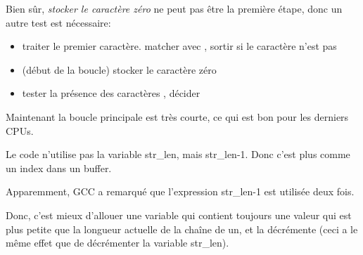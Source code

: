 Bien sûr,  \emph{stocker le caractère zéro} ne peut pas être la première étape, donc
un autre test est nécessaire:

\begin{itemize}
\item traiter le premier caractère. matcher avec \CRLF{}, sortir si le caractère
n'est pas \CRLF{}

\item (début de la boucle) stocker le caractère zéro

\item tester la présence des caractères \CRLF{}, décider
\end{itemize}

Maintenant la boucle principale est très courte, ce qui est bon pour les derniers
\ac{CPU}s.

Le code n'utilise pas la variable str\_len, mais str\_len-1.
Donc c'est plus comme un index dans un buffer.

Apparemment, GCC a remarqué que l'expression str\_len-1 est utilisée deux fois.

Donc, c'est mieux d'allouer une variable qui contient toujours une valeur qui est
plus petite que la longueur actuelle de la chaîne de un, et la décrémente (ceci a
le même effet que de décrémenter la variable str\_len).
